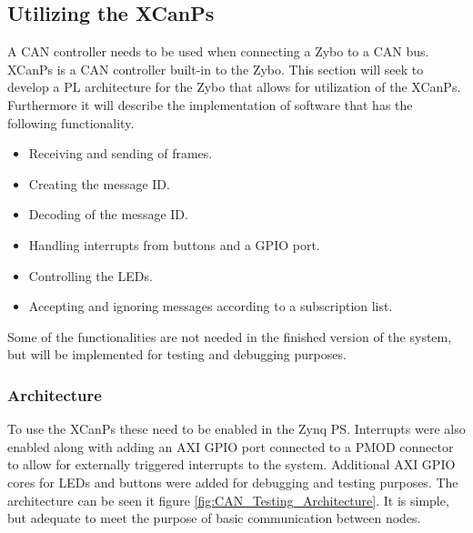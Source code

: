 \subsection{Utilizing the XCanPs}
A CAN controller needs to be used when connecting a Zybo to a CAN bus.
XCanPs is a CAN controller built-in to the Zybo.
This section will seek to develop a PL architecture for the Zybo that allows for utilization of the XCanPs.
Furthermore it will describe the implementation of software that has the following functionality.
\begin{itemize}
\item Receiving and sending of frames.
\item Creating the message ID.
\item Decoding of the message ID.
\item Handling interrupts from buttons and a GPIO port.
\item Controlling the LEDs.
\item Accepting and ignoring messages according to a subscription list.
\end{itemize}
Some of the functionalities are not needed in the finished version of the system, but will be implemented for testing and debugging purposes.

\subsubsection*{Architecture}
To use the XCanPs these need to be enabled in the Zynq PS.
Interrupts were also enabled along with adding an AXI GPIO port connected to a PMOD connector to allow for externally triggered interrupts to the system.
Additional AXI GPIO cores for LEDs and buttons were added for debugging and testing purposes.
The architecture can be seen it figure \ref{fig:CAN_Testing_Architecture}. 
It is simple, but adequate to meet the purpose of basic communication between nodes.

